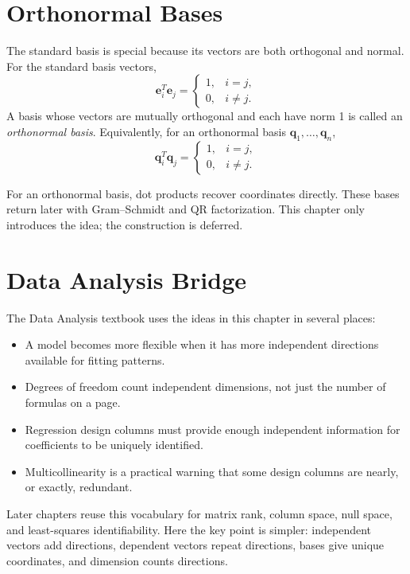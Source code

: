 \section{Orthonormal Bases}
\label{mf:orthonormal-basis-note}

The standard basis is special because its vectors are both orthogonal and normal. For the standard basis vectors,
\[
    \mathbf{e}_i^T\mathbf{e}_j=
    \begin{cases}
        1, & i=j,\\
        0, & i\neq j.
    \end{cases}
\]
A basis whose vectors are mutually orthogonal and each have norm 1 is called an \emph{orthonormal basis}. Equivalently, for an orthonormal basis \(\mathbf{q}_1,\ldots,\mathbf{q}_n\),
\[
    \mathbf{q}_i^T\mathbf{q}_j=
    \begin{cases}
        1, & i=j,\\
        0, & i\neq j.
    \end{cases}
\]

For an orthonormal basis, dot products recover coordinates directly. These bases return later with Gram--Schmidt and QR factorization. This chapter only introduces the idea; the construction is deferred.

\section{Data Analysis Bridge}
\label{mf:ch06-data-analysis-bridge}

The Data Analysis textbook uses the ideas in this chapter in several places:
\begin{itemize}
    \item A model becomes more flexible when it has more independent directions available for fitting patterns.
    \item Degrees of freedom count independent dimensions, not just the number of formulas on a page.
    \item Regression design columns must provide enough independent information for coefficients to be uniquely identified.
    \item Multicollinearity is a practical warning that some design columns are nearly, or exactly, redundant.
\end{itemize}

Later chapters reuse this vocabulary for matrix rank, column space, null space, and least-squares identifiability. Here the key point is simpler: independent vectors add directions, dependent vectors repeat directions, bases give unique coordinates, and dimension counts directions.

